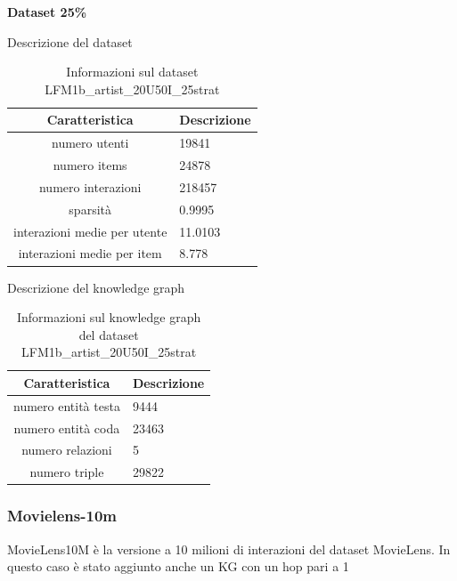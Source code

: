 \noindent\textbf{Dataset 25\%}

\noindent Descrizione del dataset
\begin{table}[H]
    \centering
    \footnotesize
    \begin{tabularx}{\textwidth}{|c|X|}
        \hline
        \textbf{Caratteristica} & \textbf{Descrizione} \\
        \hline
        numero utenti & 19841 \\
        \hline
        numero items & 24878 \\
        \hline
        numero interazioni & 218457 \\
        \hline
        sparsità & 0.9995 \\
        \hline
        interazioni medie per utente & 11.0103 \\
        \hline
        interazioni medie per item & 8.778 \\
        \hline
    \end{tabularx}
    \caption{Informazioni sul dataset LFM1b\_artist\_20U50I\_25strat}
    \label{tab:dataset_info}
\end{table}


\noindent Descrizione del knowledge graph
\begin{table}[H]
    \centering
    \footnotesize
    \begin{tabularx}{\textwidth}{|c|X|}
        \hline
        \textbf{Caratteristica} & \textbf{Descrizione} \\
        \hline
        numero entità testa & 9444 \\
        \hline
        numero entità coda & 23463 \\
        \hline
        numero relazioni & 5 \\
        \hline
        numero triple & 29822 \\
        \hline
    \end{tabularx}
    \caption{Informazioni sul knowledge graph del dataset LFM1b\_artist\_20U50I\_25strat}
    \label{tab:dataset_info}
\end{table}

\subsubsection{Movielens-10m}
\noindent MovieLens10M è la versione a 10 milioni di interazioni del dataset MovieLens. In questo caso è stato aggiunto anche un KG con un hop pari a 1

